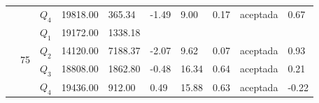 \begin{table}[]
\begin{tabular}{|l|l|l|l|l|l|l|l|l|l|}
 &  & $Q_4$ & 19818.00 & 365.34 & -1.49 & 9.00 & 0.17 & aceptada & 0.67 \\ \cline{2-10} 
 & \multirow{4}{*}{75} & $Q_1$ & 19172.00 & 1338.18 & \multicolumn{5}{l|}{} \\ \cline{3-10} 
 &  & $Q_2$ & 14120.00 & 7188.37 & -2.07 & 9.62 & 0.07 & aceptada & 0.93 \\ \cline{3-10} 
 &  & $Q_3$ & 18808.00 & 1862.80 & -0.48 & 16.34 & 0.64 & aceptada & 0.21 \\ \cline{3-10} 
 &  & $Q_4$ & 19436.00 & 912.00 & 0.49 & 15.88 & 0.63 & aceptada & -0.22 \\ \hline
\end{tabular}
\end{table}

\clearpage

